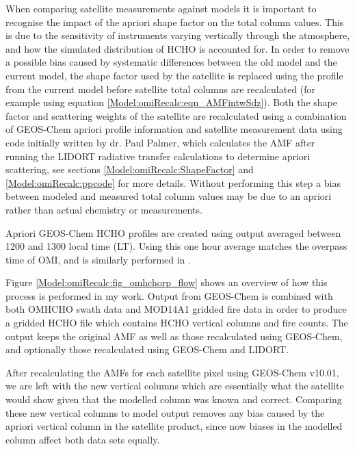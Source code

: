   When comparing satellite measurements against models it is important to recognise the impact of the apriori shape factor on the total column values.
  This is due to the sensitivity of instruments varying vertically through the atmosphere, and how the simulated distribution of HCHO is accounted for.
  In order to remove a possible bias caused by systematic differences between the old model and the current model, the shape factor used by the satellite is replaced using the profile from the current model before satellite total columns are recalculated (for example using equation \ref{Model:omiRecalc:eqn_AMFintwSdz}).
  Both the shape factor and scattering weights of the satellite are recalculated using a combination of GEOS-Chem apriori profile information and satellite measurement data using code initially written by dr. Paul Palmer, which calculates the AMF after running the LIDORT radiative transfer calculations to determine apriori scattering, see sections \ref{Model:omiRecalc:ShapeFactor} and \ref{Model:omiRecalc:ppcode} for more details.
  Without performing this step a bias between modeled and measured total column values may be due to an apriori rather than actual chemistry or measurements.
  
  Apriori GEOS-Chem HCHO profiles are created using output averaged between 1200 and 1300 local time (LT).
  Using this one hour average matches the overpass time of OMI, and is similarly performed in \textcite{Jin2017}.
  
  

  
  Figure \ref{Model:omiRecalc:fig_omhchorp_flow} shows an overview of how this process is performed in my work.
  Output from GEOS-Chem is combined with both OMHCHO swath data and MOD14A1 gridded fire data in order to produce a gridded HCHO file which contains HCHO vertical columns and fire counts. 
  The output keeps the original AMF as well as those recalculated using GEOS-Chem, and optionally those recalculated using GEOS-Chem and LIDORT.
  
  
  
  
  After recalculating the AMFs for each satellite pixel using GEOS-Chem v10.01, we are left with the new vertical columns which are essentially what the satellite would show given that the modelled column was known and correct.
  Comparing these new vertical columns to model output removes any bias caused by the apriori vertical column in the satellite product, since now biases in the modelled column affect both data sets equally.
  
